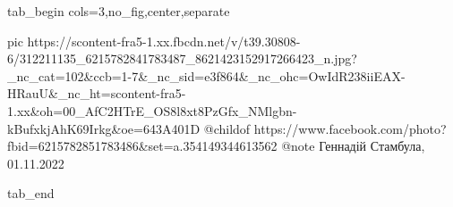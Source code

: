  
 
 
 
 


\ifcmt
  tab_begin cols=3,no_fig,center,separate

     pic https://scontent-fra5-1.xx.fbcdn.net/v/t39.30808-6/312211135_6215782841783487_8621423152917266423_n.jpg?_nc_cat=102&ccb=1-7&_nc_sid=e3f864&_nc_ohc=OwIdR238iiEAX-HRauU&_nc_ht=scontent-fra5-1.xx&oh=00_AfC2HTrE_OS8l8xt8PzGfx_NMlgbn-kBufxkjAhK69Irkg&oe=643A401D
		 @childof https://www.facebook.com/photo?fbid=6215782851783486&set=a.354149344613562
		 @note Геннадій Стамбула, 01.11.2022

  tab_end
\fi
